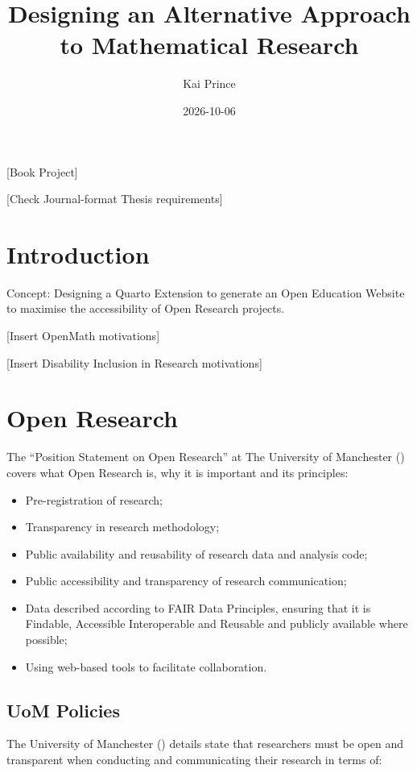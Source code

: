 \documentclass[
  british,
]{article}
\title{Designing an Alternative Approach to Mathematical Research}
\author{Kai Prince}
\date{2026-10-06}
\providecommand{\tightlist}{%
  \setlength{\itemsep}{0pt}\setlength{\parskip}{0pt}}
\begin{document}
\maketitle


{[}Book Project{]}

{[}Check Journal-format Thesis requirements{]}

\section{Introduction}\label{introduction}

Concept: Designing a Quarto Extension to generate an Open Education
Website to maximise the accessibility of Open Research projects.

{[}Insert OpenMath motivations{]}

{[}Insert Disability Inclusion in Research motivations{]}

\section{Open Research}\label{open-research}

The ``Position Statement on Open Research'' at The University of
Manchester () covers what
Open Research is, why it is important and its principles:

\begin{itemize}
\tightlist
\item
  Pre-registration of research;
\item
  Transparency in research methodology;
\item
  Public availability and reusability of research data and analysis
  code;
\item
  Public accessibility and transparency of research communication;
\item
  Data described according to FAIR Data Principles, ensuring that it is
  Findable, Accessible Interoperable and Reusable and publicly available
  where possible;
\item
  Using web-based tools to facilitate collaboration.
\end{itemize}

\subsection{UoM Policies}\label{uom-policies}

The University of Manchester ()
details state that researchers must be open and transparent when
conducting and communicating their research in terms of:
\end{document}
